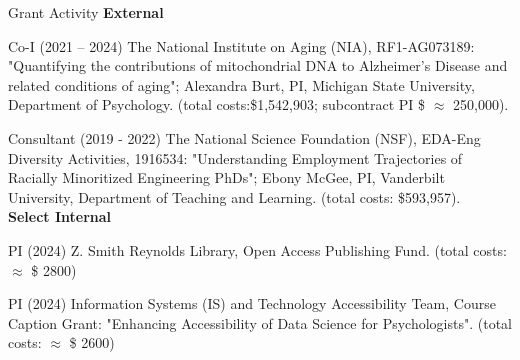\begin{rSection}{\textrm{Grant Activity}}%
{\large \textbf{External}}%
\begin{etaremune}
\item Co-I (2021 – 2024) The National Institute on Aging (NIA), RF1-AG073189: "Quantifying the contributions of mitochondrial DNA to Alzheimer's Disease and related conditions of aging"; Alexandra Burt, PI, Michigan State University, Department of Psychology. (total costs:\$1,542,903; subcontract PI \$ $\approx$ 250,000).

\item Consultant (2019 - 2022) The National Science Foundation (NSF), EDA-Eng Diversity Activities, 1916534: "Understanding Employment Trajectories of Racially Minoritized Engineering PhDs"; Ebony McGee, PI, Vanderbilt University, Department of Teaching and Learning. (total costs: \$593,957).
\smallskip\\
\hspace*{-8mm}\large{\bf{Select Internal}}%
\item PI (2024) Z. Smith Reynolds Library, Open Access Publishing Fund. (total costs: $\approx$ \$ 2800) %
\item PI (2024) Information Systems (IS) and Technology Accessibility Team, Course Caption Grant: "Enhancing Accessibility of Data Science for Psychologists". (total costs: $\approx$ \$ 2600)%
\end{etaremune}
\end{rSection}